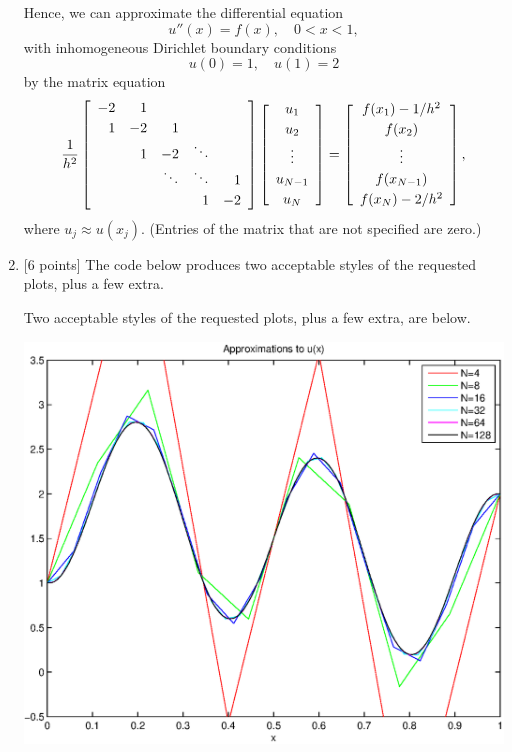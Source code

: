 \begin{solution}
\begin{enumerate}
Hence, we can approximate the differential equation
\[ u''(x) = f(x), \quad 0<x<1,\]
with inhomogeneous Dirichlet boundary conditions
      \[ u(0)=1,\quad  u(1)=2\]
by the matrix equation
\[ {1\over h^2} \left[\begin{array}{rrrrr}
              -2 & 1 \\[0.25em]
               1 & -2 & 1 \\
                 &  1  & -2 & \ddots \\
                 & & \ddots & \ddots & 1 \\[0.25em]
                 & & & 1 & -2 
               \end{array}\right]
          \left[\begin{array}{c} u_1 \\[0.25em] u_2 \\[0.25em] \vdots \\[0.25em] u_{N-1} \\[0.25em] u_N \end{array}\right]
 =   \left[\begin{array}{c} f(x_1)-1/h^2 \\[0.25em] f(x_2) \\[0.25em] \vdots \\[0.25em] f(x_{N-1}) \\[0.25em] f(x_N)-2/h^2 \end{array}\right],\]
where $u_j \approx u(x_j)$.  (Entries of the matrix that are not specified are zero.)
\\
\item {[6 points]} The code below produces two acceptable styles of the requested plots, plus a few extra.



Two acceptable styles of the  requested plots, plus a few extra, are below.

\begin{center}
\includegraphics[scale=0.7]{together_d}
\end{center}


\end{enumerate}
\end{solution}
